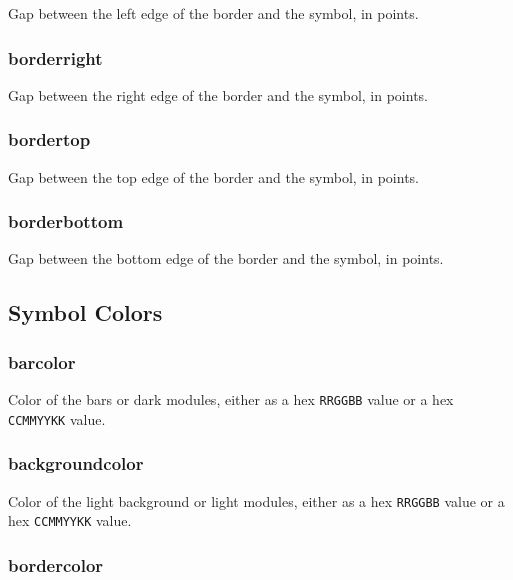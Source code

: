 Gap between the left edge of the border and the symbol, in points.

\hypertarget{borderright}{%
\subsubsection{borderright}\label{borderright}}

Gap between the right edge of the border and the symbol, in points.

\hypertarget{bordertop}{%
\subsubsection{bordertop}\label{bordertop}}

Gap between the top edge of the border and the symbol, in points.

\hypertarget{borderbottom}{%
\subsubsection{borderbottom}\label{borderbottom}}

Gap between the bottom edge of the border and the symbol, in points.

\hypertarget{symbol-colors}{%
\subsection{Symbol Colors}\label{symbol-colors}}

\hypertarget{barcolor}{%
\subsubsection{barcolor}\label{barcolor}}

Color of the bars or dark modules, either as a hex \texttt{RRGGBB} value
or a hex \texttt{CCMMYYKK} value.

\hypertarget{backgroundcolor}{%
\subsubsection{backgroundcolor}\label{backgroundcolor}}

Color of the light background or light modules, either as a hex
\texttt{RRGGBB} value or a hex \texttt{CCMMYYKK} value.

\hypertarget{bordercolor}{%
\subsubsection{bordercolor}\label{bordercolor}}

